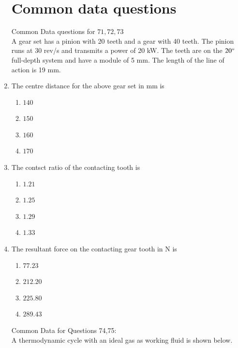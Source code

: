 \documentclass[journal,12pt,onecolumn,article]{IEEEtran}
\theoremstyle{remark}
\begin{document}
\begin{enumerate}
		\section*{Common data questions}
		Common Data questions for $71,72,73$ \\
		A gear set has a pinion with 20 teeth and a gear with 40 teeth. The pinion runs at 30 rev/s and transmits a power of 20 kW. The teeth are on the $20\degree$ full-depth system and have a module of 5 mm. The length of the line of action is 19 mm.
	\item The centre distance for the above gear set in mm is
		\begin{enumerate}
			\item $140$
			\item $150$
			\item $160$
			\item $170$
		\end{enumerate}
	\item The contsct ratio of the contacting tooth is 
		\begin{enumerate}
			\item $1.21$
			\item $1.25$
			\item $1.29$
			\item $1.33$
		\end{enumerate}
	\item The resultant force on the contacting gear tooth in N is 
		\begin{enumerate}
			\item $77.23$
			\item $212.20$
			\item $225.80$
			\item $289.43$
		\end{enumerate}
		Common Data for Questions 74,75: \\
		A thermodynamic cycle with an ideal gas as working fluid is shown below. \\
			\begin{figure}[H]
	\centering
				\begin{minipage}{1\textwidth}

\end{minipage}
\end{figure}
\end{enumerate}
\end{document}
